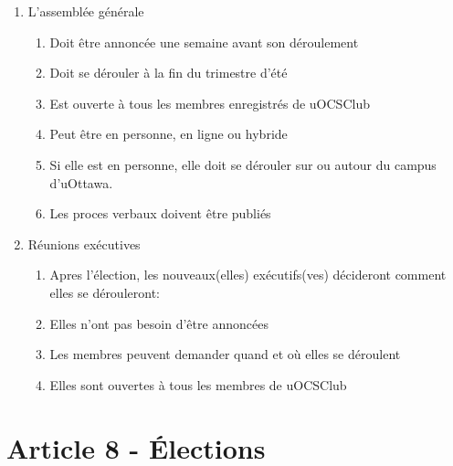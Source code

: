 \begin{enumerate}
    \item L'assemblée générale
        \begin{enumerate}
            \item Doit être annoncée une semaine avant son déroulement
            \item Doit se dérouler à la fin du trimestre d'été
            \item Est ouverte à tous les membres enregistrés de uOCSClub
            \item Peut être en personne, en ligne ou hybride
            \item Si elle est en personne, elle doit se dérouler sur ou autour du campus d'uOttawa.
            \item Les proces verbaux doivent être publiés
        \end{enumerate}
    \item Réunions exécutives
        \begin{enumerate}
            \item Apres l'élection, les nouveaux(elles) exécutifs(ves) décideront comment elles se dérouleront:
            \item Elles n'ont pas besoin d'être annoncées
            \item Les membres peuvent demander quand et où elles se déroulent
            \item Elles sont ouvertes à tous les membres de uOCSClub
        \end{enumerate}
\end{enumerate}

\section*{Article 8 - Élections}



